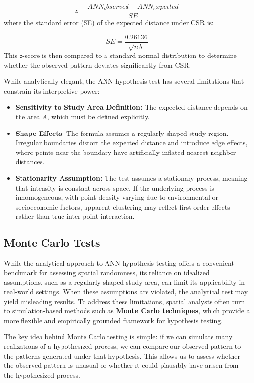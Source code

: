 \documentclass[
  letterpaper,
]{book}
\begin{document}
\[
z = \frac{ANN_observed - ANN_expected}{SE}
\] where the standard error (SE) of the expected distance under CSR is:

\[
SE = \frac{0.26136}{\sqrt{n\lambda}}
\] This z-score is then compared to a standard normal distribution to
determine whether the observed pattern deviates significantly from CSR.

While analytically elegant, the ANN hypothesis test has several
limitations that constrain its interpretive power:

\begin{itemize}
\item
  \textbf{Sensitivity to Study Area Definition:} The expected distance
  depends on the area \(A\), which must be defined explicitly.
\item
  \textbf{Shape Effects:} The formula assumes a regularly shaped study
  region. Irregular boundaries distort the expected distance and
  introduce edge effects, where points near the boundary have
  artificially inflated nearest-neighbor distances.
\item
  \textbf{Stationarity Assumption:} The test assumes a stationary
  process, meaning that intensity is constant across space. If the
  underlying process is inhomogeneous, with point density varying due to
  environmental or socioeconomic factors, apparent clustering may
  reflect first-order effects rather than true inter-point interaction.
\end{itemize}

\subsection{Monte Carlo Tests}\label{monte-carlo-tests}

While the analytical approach to ANN hypothesis testing offers a
convenient benchmark for assessing spatial randomness, its reliance on
idealized assumptions, such as a regularly shaped study area, can limit
its applicability in real-world settings. When these assumptions are
violated, the analytical test may yield misleading results. To address
these limitations, spatial analysts often turn to simulation-based
methods such as \textbf{Monte Carlo techniques}, which provide a more
flexible and empirically grounded framework for hypothesis testing.

The key idea behind Monte Carlo testing is simple: if we can simulate
many realizations of a hypothesized process, we can compare our observed
pattern to the patterns generated under that hypothesis. This allows us
to assess whether the observed pattern is unusual or whether it could
plausibly have arisen from the hypothesized process.
\end{document}
